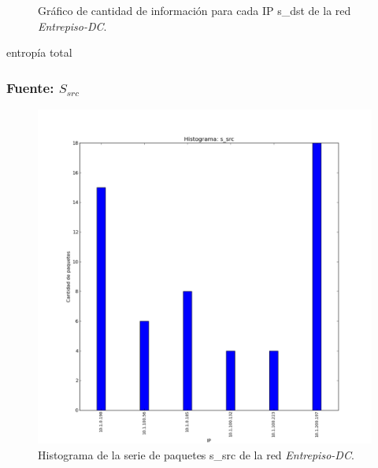 \documentclass[10pt, a4paper]{article}
\begin{document}
\begin{figure}[H]
\begin{minipage}{0.48\linewidth}
    \caption{Gráfico de cantidad de información para cada IP s\_dst de la red \emph{Entrepiso-DC}.}
    \label{fig:informacion-entrepiso-dc-s-dst}
  \end{minipage}
\end{figure}

entropía total

\subsubsection{Fuente: $S_{src}$}

\begin{figure}[H]
  \begin{minipage}{0.48\linewidth}
    \includegraphics[width=\linewidth]{../imgs/entrepiso-dc-ips_s_src_hist.png}
    \caption{Histograma de la serie de paquetes s\_src de la red \emph{Entrepiso-DC}.}
    \label{fig:histograma-entrepiso-dc-s-src}
  \end{minipage}
\hfill
  \begin{minipage}{0.48\linewidth}

\end{minipage}
\end{figure}
\end{document}
